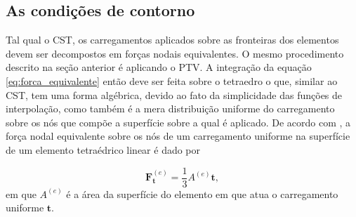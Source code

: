 \subsection{As condições de contorno}

Tal qual o CST, os carregamentos aplicados sobre as fronteiras dos elementos devem ser decompostos em forças nodais equivalentes. O mesmo procedimento descrito na seção anterior é aplicando o PTV. A integração da equação \ref{eq:forca_equivalente} então deve ser feita sobre o tetraedro o que, similar ao CST, tem uma forma algébrica, devido ao fato da simplicidade das funções de interpolação, como também é a mera distribuição uniforme do carregamento sobre os nós que compõe a superfície sobre a qual é aplicado. De acordo com , a força nodal equivalente sobre os nós de um carregamento uniforme na superfície de um elemento tetraédrico linear é dado por

\begin{equation}
    \bm{F}^{(e)}_{\bm{t}} = \frac{1}{3} A^{(e)} \bm{t},
\end{equation}
em que $A^{(e)}$ é a área da superfície do elemento em que atua o carregamento uniforme $\bm{t}$.
